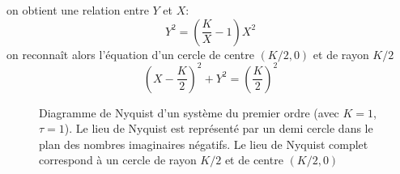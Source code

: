 on obtient une relation entre $Y$ et $X$:
\[
Y^2=\left(\dfrac{K}{X}-1\right)X^2
\]
on reconnaît alors l'équation d'un cercle de centre $(K/2,0)$ et 
de rayon $K/2$
\[
\left(X-\dfrac{K}{2}\right)^2+Y^2=\left(\dfrac{K}{2}\right)^2
\]
\begin{figure}[!hb]
    \centering
    
    \caption{Diagramme de Nyquist d'un système du premier ordre 
             (avec $K=1$,$\tau=1$). 
             Le lieu de Nyquist est représenté par un demi cercle 
             dans le plan des nombres imaginaires négatifs. Le lieu de 
             Nyquist complet correspond à un cercle de 
             rayon $K/2$ et de centre $(K/2,0)$ 
             \label{fig-nyquist_1er}}
\end{figure}
\clearpage
